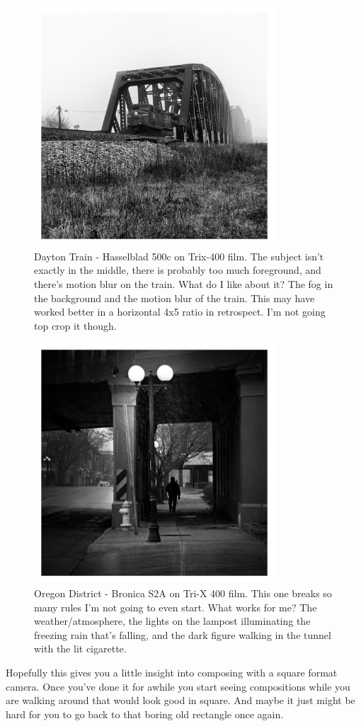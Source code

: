 \documentclass[a4paper]{article}
\begin{document}
\begin{figure}[ht!]
    \centering
    \includegraphics[width=90mm]{img/40177654042_f149a233ca_k.jpeg}
    \caption{Dayton Train - Hasselblad 500c on Trix-400 film. The subject isn’t exactly in the middle, there is probably too much foreground, and there’s motion blur on the train. What do I like about it? The fog in the background and the motion blur of the train. This may have worked better in a horizontal 4x5 ratio in retrospect. I’m not going top crop it though.}
\end{figure}

\begin{figure}[ht!]
    \centering
    \includegraphics[width=90mm]{img/39970026082_4798ac7249_k.jpeg}
    \caption{Oregon District - Bronica S2A on Tri-X 400 film. This one breaks so many rules I’m not going to even start. What works for me? The weather/atmosphere, the lights on the lampost illuminating the freezing rain that’s falling, and the dark figure walking in the tunnel with the lit cigarette.}
\end{figure}

Hopefully this gives you a little insight into composing with a square format camera. Once you’ve done it for awhile you start seeing compositions while you are walking around that would look good in square. And maybe it just might be hard for you to go back to that boring old rectangle once again.  
\end{document}
